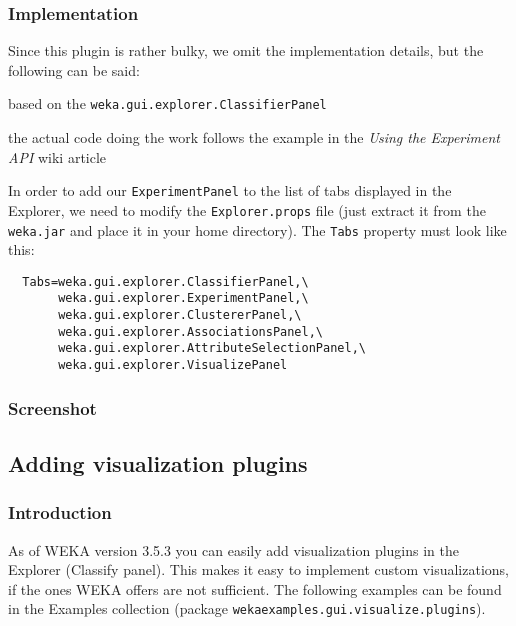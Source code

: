\subsubsection*{Implementation}
\begin{tight_itemize}
  \item Since this plugin is rather bulky, we omit the implementation details,
but the following can be said:
  \begin{tight_itemize}
	\item based on the \texttt{weka.gui.explorer.ClassifierPanel}
	\item the actual code doing the work follows the example in the
\textit{Using the Experiment API} wiki article \cite{wekawiki}
  \end{tight_itemize}
  \item In order to add our \texttt{ExperimentPanel} to the list of tabs
displayed in the Explorer, we need to modify the \texttt{Explorer.props} file
(just extract it from the \texttt{weka.jar} and place it in your home
directory). The \texttt{Tabs} property must look like this:
  \begin{verbatim}
  Tabs=weka.gui.explorer.ClassifierPanel,\
       weka.gui.explorer.ExperimentPanel,\
       weka.gui.explorer.ClustererPanel,\
       weka.gui.explorer.AssociationsPanel,\
       weka.gui.explorer.AttributeSelectionPanel,\
       weka.gui.explorer.VisualizePanel
  \end{verbatim}
\end{tight_itemize}

\subsubsection*{Screenshot}
\begin{center}
\end{center}

\newpage
\subsection{Adding visualization plugins}
\subsubsection*{Introduction}
As of WEKA version 3.5.3 you can easily add visualization plugins in the
Explorer (Classify panel). This makes it easy to implement custom
visualizations, if the ones WEKA offers are not sufficient. The following
examples can be found in the Examples collection \cite{wekaexamples} (package
\texttt{wekaexamples.gui.visualize.plugins}).

